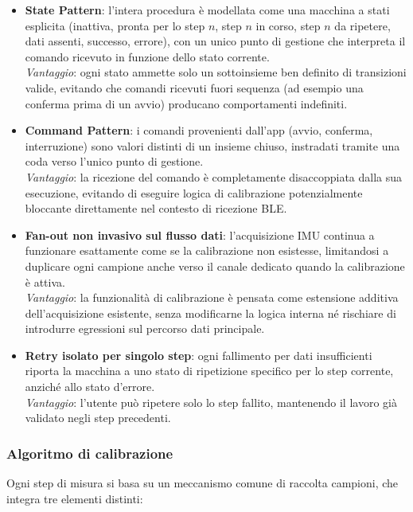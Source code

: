 \begin{itemize}
    \item \textbf{State Pattern}: l'intera procedura è modellata come una macchina a stati esplicita (inattiva, pronta per lo step $n$, step $n$ in
    corso, step $n$ da ripetere, dati assenti, successo, errore), con un unico punto di gestione che interpreta il comando ricevuto in funzione dello
    stato corrente.\\
    \textit{Vantaggio}: ogni stato ammette solo un sottoinsieme ben definito di transizioni valide, evitando che comandi ricevuti
    fuori sequenza (ad esempio una conferma prima di un avvio) producano comportamenti indefiniti.

    \item \textbf{Command Pattern}: i comandi provenienti dall'app (avvio, conferma, interruzione) sono valori distinti di un insieme chiuso,
    instradati tramite una coda verso l'unico punto di gestione. \\
    \textit{Vantaggio}: la ricezione del comando è completamente disaccoppiata dalla
    sua esecuzione, evitando di eseguire logica di calibrazione potenzialmente bloccante direttamente nel contesto di ricezione BLE.
    \item \textbf{Fan-out non invasivo sul flusso dati}: l'acquisizione IMU continua a funzionare esattamente come se la calibrazione non esistesse,
    limitandosi a duplicare ogni campione anche verso il canale dedicato quando la calibrazione è attiva. \\
    \textit{Vantaggio}: la funzionalità di calibrazione è pensata come estensione additiva dell'acquisizione esistente, senza modificarne la logica interna 
    né rischiare di introdurre egressioni sul percorso dati principale.
    \item \textbf{Retry isolato per singolo step}: ogni fallimento per dati insufficienti riporta la macchina a uno stato di ripetizione specifico
    per lo step corrente, anziché allo stato d'errore. \\
    \textit{Vantaggio}: l'utente può ripetere solo lo step fallito, mantenendo il lavoro già validato negli step precedenti.
\end{itemize}

\subsubsection{Algoritmo di calibrazione}

Ogni step di misura si basa su un meccanismo comune di raccolta campioni, che integra tre elementi distinti:

